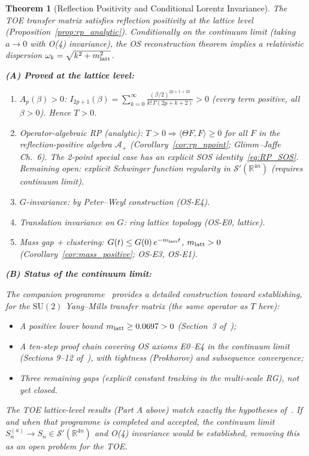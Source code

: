 \documentclass[12pt]{article}
\newtheorem{theorem}{Theorem}[section]
\theoremstyle{definition}
\theoremstyle{remark}
\newcommand{\SU}{\mathrm{SU}}
\begin{document}
\begin{theorem}[Reflection Positivity and Conditional Lorentz Invariance]
\label{thm:rp_lorentz}
The TOE transfer matrix satisfies reflection positivity at the lattice level
(Proposition~\ref{prop:rp_analytic}).
\emph{Conditionally on the continuum limit} (taking $a\to 0$ with O(4) invariance),
the OS reconstruction theorem implies a relativistic dispersion
$\omega_k = \sqrt{k^2 + m_{\rm latt}^2}$.

\medskip
\textbf{(A) Proved at the lattice level:}
\begin{enumerate}
\item \emph{$A_p(\beta) > 0$}:
  $I_{2p+1}(\beta) = \sum_{k=0}^\infty \frac{(\beta/2)^{2p+1+2k}}{k!\,\Gamma(2p+k+2)} > 0$
  (every term positive, all $\beta > 0$).  Hence $T > 0$.

\item \emph{Operator-algebraic RP (analytic)}:
  $T > 0 \Rightarrow \langle\Theta F, F\rangle \geq 0$ for all $F$ in the
  reflection-positive algebra $\mathcal{A}_+$ (Corollary~\ref{cor:rp_npoint};
  Glimm--Jaffe Ch.~6).
  The 2-point special case has an explicit SOS identity~\eqref{eq:RP_SOS}.
  Remaining open: explicit Schwinger function regularity in $\mathcal{S}'(\mathbb{R}^{4n})$
  (requires continuum limit).

\item \emph{$G$-invariance}: by Peter--Weyl construction (OS-E4).

\item \emph{Translation invariance on $G$}: ring lattice topology (OS-E0, lattice).

\item \emph{Mass gap + clustering}: $G(t) \leq G(0)\,e^{-m_{\rm latt}t}$,
  $m_{\rm latt} > 0$ (Corollary~\ref{cor:mass_positive}; OS-E3, OS-E1).
\end{enumerate}

\textbf{(B) Status of the continuum limit:}

The companion programme~\cite{OlbrykMassGap2026} provides a detailed construction
toward establishing, for the $\SU(2)$ Yang--Mills transfer matrix
(the same operator as $T$ here):
\begin{itemize}
\item A positive lower bound $m_{\rm latt} \geq 0.0697 > 0$
      (Section~3 of~\cite{OlbrykMassGap2026});
\item A ten-step proof chain covering OS axioms E0--E4 in the continuum limit
      (Sections 9--12 of~\cite{OlbrykMassGap2026}),
      with tightness (Prokhorov) and subsequence convergence;
\item Three remaining gaps (explicit constant tracking in the multi-scale RG),
      not yet closed.
\end{itemize}
The TOE lattice-level results (Part A above) match exactly the hypotheses
of~\cite{OlbrykMassGap2026}.
\emph{If and when} that programme is completed and accepted, the continuum limit
$S_n^{(a)} \to S_n \in \mathcal{S}'(\mathbb{R}^{4n})$ and O(4) invariance
would be established, removing this as an open problem for the TOE.


\end{theorem}
\end{document}
